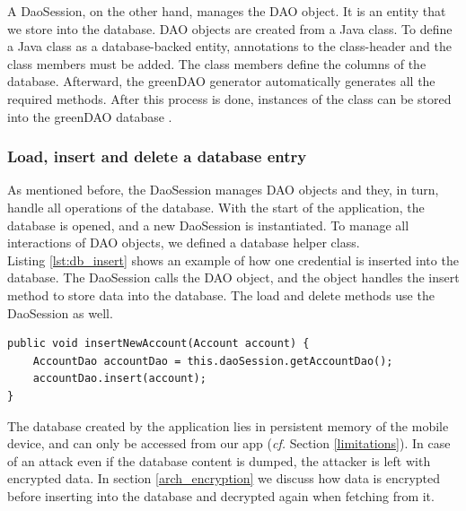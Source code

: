 A DaoSession, on the other hand, manages the DAO object. It is an entity that we store into the database. DAO objects are created from a Java class. To define a Java class as a database-backed entity, annotations to the class-header and the class members must be added. The class members define the columns of the database. Afterward, the greenDAO generator automatically generates all the required methods. After this process is done, instances of the class can be stored into the greenDAO database \cite{Greendao}.

\subsubsection*{Load, insert and delete a database entry}
As mentioned before, the DaoSession manages DAO objects and they, in turn, handle all operations of the database. With the start of the application, the database is opened, and a new DaoSession is instantiated. To manage all interactions of DAO objects, we defined a database helper class. \\
Listing \ref{lst:db_insert} shows an example of how one credential is inserted into the database. The DaoSession calls the DAO object, and the object handles the insert method to store data into the database. The load and delete methods use the DaoSession as well. 

\begin{lstlisting}[float,floatplacement=h, caption= Insert entry into database, label=lst:db_insert]
public void insertNewAccount(Account account) {
    AccountDao accountDao = this.daoSession.getAccountDao();
    accountDao.insert(account);
}
\end{lstlisting}
\vspace{0.5cm}

The database created by the application lies in persistent memory of the mobile device, and can only be accessed from our app (\textit{cf.} Section \ref{limitations}). In case of an attack even if the database content is dumped, the attacker is left with encrypted data. In section \ref{arch_encryption} we discuss how data is encrypted before inserting into the database and decrypted again when fetching from it. \\


